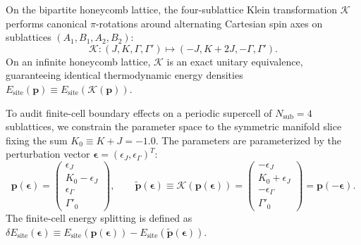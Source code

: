 On the bipartite honeycomb lattice, the four-sublattice Klein transformation $\mathcal{K}$ performs canonical $\pi$-rotations around alternating Cartesian spin axes on sublattices $(A_1, B_1, A_2, B_2)$:
\begin{equation}
\label{eq:m1_4_5_klein_map}
\mathcal{K}: (J, K, \Gamma, \Gamma') \mapsto (-J, K + 2J, -\Gamma, \Gamma').
\end{equation}
On an infinite honeycomb lattice, $\mathcal{K}$ is an exact unitary equivalence, guaranteeing identical thermodynamic energy densities $E_{\mathrm{site}}(\mathbf{p}) \equiv E_{\mathrm{site}}(\mathcal{K}(\mathbf{p}))$.

To audit finite-cell boundary effects on a periodic supercell of $N_{\mathrm{sub}} = 4$ sublattices, we constrain the parameter space to the symmetric manifold slice fixing the sum $K_0 \equiv K + J = -1.0$. The parameters are parameterized by the perturbation vector $\boldsymbol{\epsilon} = (\epsilon_J, \epsilon_\Gamma)^T$:
\begin{equation}
\label{eq:m1_4_5_symmetric_klein_slice}
\mathbf{p}(\boldsymbol{\epsilon}) = \begin{pmatrix} \epsilon_J \\ K_0 - \epsilon_J \\ \epsilon_\Gamma \\ \Gamma'_0 \end{pmatrix}, \qquad
\tilde{\mathbf{p}}(\boldsymbol{\epsilon}) \equiv \mathcal{K}(\mathbf{p}(\boldsymbol{\epsilon})) = \begin{pmatrix} -\epsilon_J \\ K_0 + \epsilon_J \\ -\epsilon_\Gamma \\ \Gamma'_0 \end{pmatrix} = \mathbf{p}(-\boldsymbol{\epsilon}).
\end{equation}
The finite-cell energy splitting is defined as $\delta E_{\mathrm{site}}(\boldsymbol{\epsilon}) \equiv E_{\mathrm{site}}(\mathbf{p}(\boldsymbol{\epsilon})) - E_{\mathrm{site}}(\tilde{\mathbf{p}}(\boldsymbol{\epsilon}))$.

